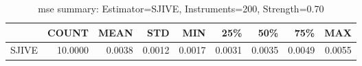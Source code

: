 \begin{table}[ht]
\centering
\caption{mse summary: Estimator=SJIVE, Instruments=200, Strength=0.70}
\begin{tabular}{lrrrrrrrr}
\toprule
 & COUNT & MEAN & STD & MIN & 25\% & 50\% & 75\% & MAX \\
\midrule
SJIVE & 10.0000 & 0.0038 & 0.0012 & 0.0017 & 0.0031 & 0.0035 & 0.0049 & 0.0055 \\
\bottomrule
\end{tabular}
\end{table}
